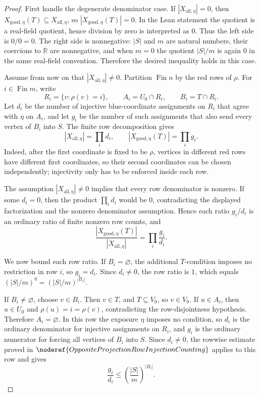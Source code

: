 \begin{proof}
First handle the degenerate denominator case.  If
\(|X_{\mathrm{all},\eta}|=0\), then
\(X_{\mathrm{good},\eta}(T)\subseteq X_{\mathrm{all},\eta}\), so
\(|X_{\mathrm{good},\eta}(T)|=0\).  In the Lean statement the quotient is a
real-field quotient, hence division by zero is interpreted as \(0\).  Thus
the left side is \(0/0=0\).  The right side is nonnegative: \(|S|\) and
\(m\) are natural numbers, their coercions to \(\mathbb R\) are
nonnegative, and when \(m=0\) the quotient \(|S|/m\) is again \(0\) in the
same real-field convention.  Therefore the desired inequality holds in this
case.

Assume from now on that \(|X_{\mathrm{all},\eta}|\ne 0\).  Partition
\(\operatorname{Fin}n\) by the red rows of \(\rho\).  For
\(i\in\operatorname{Fin}m\), write
\[
R_i=\{v:\rho(v)=i\},\qquad A_i=U_0\cap R_i,\qquad B_i=T\cap R_i .
\]
Let \(d_i\) be the number of injective blue-coordinate assignments on
\(R_i\) that agree with \(\eta\) on \(A_i\), and let \(g_i\) be the number
of such assignments that also send every vertex of \(B_i\) into \(S\).
The finite row decomposition gives
\[
|X_{\mathrm{all},\eta}|=\prod_i d_i,\qquad
|X_{\mathrm{good},\eta}(T)|=\prod_i g_i.
\]
Indeed, after the first coordinate is fixed to be \(\rho\), vertices in
different red rows have different first coordinates, so their second
coordinates can be chosen independently; injectivity only has to be enforced
inside each row.

The assumption \(|X_{\mathrm{all},\eta}|\ne0\) implies that every row
denominator is nonzero.  If some \(d_i=0\), then the product
\(\prod_i d_i\) would be \(0\), contradicting the displayed factorization
and the nonzero denominator assumption.  Hence each ratio \(g_i/d_i\) is an
ordinary ratio of finite nonzero row counts, and
\[
\frac{|X_{\mathrm{good},\eta}(T)|}{|X_{\mathrm{all},\eta}|}
=\prod_i \frac{g_i}{d_i}.
\]

We now bound each row ratio.  If \(B_i=\varnothing\), the additional
\(T\)-condition imposes no restriction in row \(i\), so \(g_i=d_i\).  Since
\(d_i\ne0\), the row ratio is \(1\), which equals
\((|S|/m)^0=(|S|/m)^{|B_i|}\).

If \(B_i\ne\varnothing\), choose \(v\in B_i\).  Then \(v\in T\), and
\(T\subseteq V_0\), so \(v\in V_0\).  If \(u\in A_i\), then
\(u\in U_0\) and \(\rho(u)=i=\rho(v)\), contradicting the row-disjointness
hypothesis.  Therefore \(A_i=\varnothing\).  In this row the exposure
\(\eta\) imposes no condition, so \(d_i\) is the ordinary denominator for
injective assignments on \(R_i\), and \(g_i\) is the ordinary numerator for
forcing all vertices of \(B_i\) into \(S\).  Since \(d_i\ne0\), the rowwise
estimate proved in \(\noderef{OppositeProjectionRowInjectionCounting}\)
applies to this row and gives
\[
\frac{g_i}{d_i}\le \left(\frac{|S|}{m}\right)^{|B_i|}.
\]


\end{proof}
